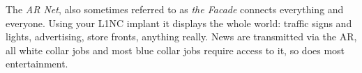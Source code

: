 The \emph{AR Net}, also sometimes referred to as \emph{the Facade} connects everything and everyone.
Using your L1NC implant it displays the whole world:
	traffic signs and lights, advertising, store fronts, anything really.
News are transmitted via the AR, all white collar jobs and most blue collar jobs require access to it, so does most entertainment.